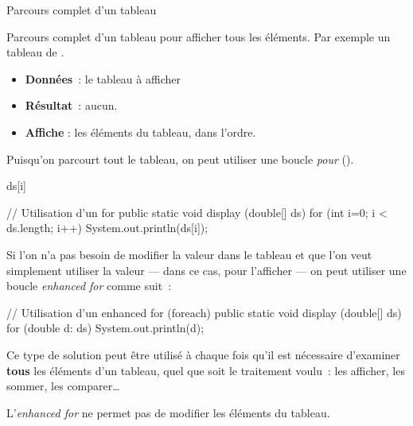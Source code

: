 \begin{Fiche}{Parcours complet d’un tableau}
\label{fiche:tab-parcours-complet}


Parcours complet d'un tableau pour afficher tous les éléments. Par exemple un
tableau de .

	
	\begin{itemize}
	\item \textbf{Données}~: le tableau à afficher
	\item \textbf{Résultat}~: aucun.
	\item \textbf{Affiche} : les éléments du tableau, dans l'ordre.
	\end{itemize}


	Puisqu’on parcourt tout le tableau, on peut utiliser une boucle \emph{pour}
	().
	
	\begin{pseudocode}
				\Write ds[i]
			\EndFor
		\EndAlgo
	\end{pseudocode}

	\begin{java}
// Utilisation d'un for
public static void display (double[] ds){
	for (int i=0; i < ds.length; i++){
		System.out.println(ds[i]);
	}
}
	\end{java}

	Si l'on n'a pas besoin de modifier la valeur dans le tableau et que l'on
	veut simplement utiliser la valeur — dans ce cas, pour l'afficher — on peut
	utiliser une boucle \textit{enhanced for} comme suit~:

	\begin{java}
// Utilisation d'un enhanced for (foreach)
public static void display (double[] ds){
	for (double d: ds){
		System.out.println(d);
	}
}
	\end{java}


	Ce type de solution peut être utilisé à chaque fois qu’il est nécessaire
	d'examiner \textbf{tous} les éléments d’un tableau, quel que soit le
	traitement voulu~: les afficher, les sommer, les comparer\dots

	L'\textit{enhanced for} ne permet pas de modifier les éléments du tableau. 
	
	
\end{Fiche}
